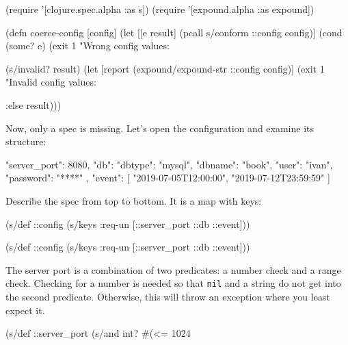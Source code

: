 \else

\begin{clojure}
(require '[clojure.spec.alpha :as s])
(require '[expound.alpha :as expound])

(defn coerce-config [config]
  (let [[e result] (pcall s/conform ::config config)]
    (cond
      (some? e)
      (exit 1 "Wrong config values: %

      (s/invalid? result)
      (let [report (expound/expound-str ::config config)]
        (exit 1 "Invalid config values: %

      :else result)))
\end{clojure}

\fi

Now, only a spec is missing. Let's open the configuration and examine its structure:


\begin{json}
{
    "server_port": 8080,
    "db": {
        "dbtype":   "mysql",
        "dbname":   "book",
        "user":     "ivan",
        "password": "****"
    },
    "event": [
        "2019-07-05T12:00:00",
        "2019-07-12T23:59:59"
    ]
}
\end{json}

\noindent
Describe the spec from top to bottom. It is a map with keys:

\ifx\DEVICETYPE\MOBILE

\begin{clojure}
(s/def ::config
  (s/keys :req-un [::server_port
                   ::db ::event]))
\end{clojure}

\else

\begin{clojure}
(s/def ::config
  (s/keys :req-un [::server_port ::db ::event]))
\end{clojure}

\fi


The server port is a combination of two predicates: a number check and a range check. Checking for a number is needed so that \verb|nil| and a string do not get into the second predicate. Otherwise, this will throw an exception where you least expect it.

\begin{clojure}
(s/def ::server_port
  (s/and int? #(<= 1024 %
\end{clojure}

